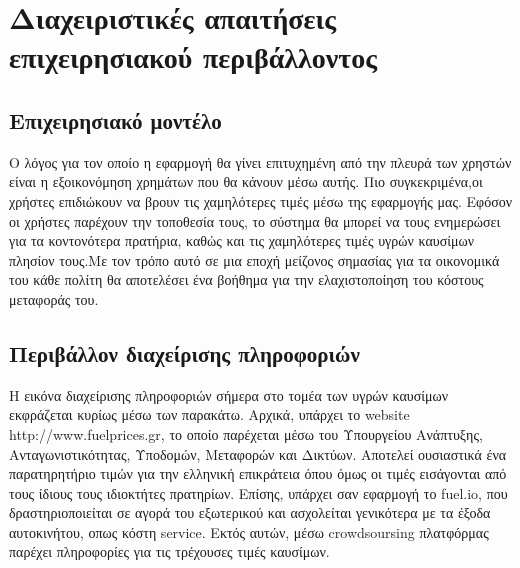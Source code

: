 \section{Διαχειριστικές απαιτήσεις επιχειρησιακού περιβάλλοντος}

\subsection{Επιχειρησιακό μοντέλο}
Ο λόγος για τον οποίο η εφαρμογή θα γίνει επιτυχημένη από την πλευρά των χρηστών είναι η εξοικονόμηση χρημάτων που θα κάνουν μέσω αυτής.
Πιο συγκεκριμένα,οι χρήστες επιδιώκουν να βρουν τις χαμηλότερες τιμές μέσω της εφαρμογής μας. Εφόσον οι χρήστες παρέχουν την τοποθεσία τους, το σύστημα θα μπορεί να τους ενημερώσει για τα κοντονότερα πρατήρια, καθώς και τις χαμηλότερες τιμές υγρών καυσίμων πλησίον τους.Με τον τρόπο αυτό σε μια εποχή μείζονος σημασίας για τα οικονομικά του κάθε πολίτη θα αποτελέσει ένα βοήθημα για την ελαχιστοποίηση του κόστους μεταφοράς του.


\subsection{Περιβάλλον διαχείρισης πληροφοριών}
Η εικόνα διαχείρισης πληροφοριών σήμερα στο τομέα των υγρών καυσίμων  εκφράζεται κυρίως μέσω των παρακάτω.
Αρχικά, υπάρχει το website http://www.fuelprices.gr, το οποίο παρέχεται μέσω του Υπουργείου Ανάπτυξης, Ανταγωνιστικότητας, Υποδομών, Μεταφορών και Δικτύων. Αποτελεί ουσιαστικά ένα παρατηρητήριο τιμών για την ελληνική επικράτεια όπου όμως οι τιμές εισάγονται από τους ίδιους τους ιδιοκτήτες πρατηρίων. 
Επίσης, υπάρχει σαν εφαρμογή το fuel.io, που δραστηριοποιείται σε αγορά του εξωτερικού και ασχολείται γενικότερα με τα έξοδα αυτοκινήτου, οπως κόστη service. Εκτός αυτών, μέσω crowdsoursing πλατφόρμας παρέχει πληροφορίες για τις τρέχουσες τιμές καυσίμων.


